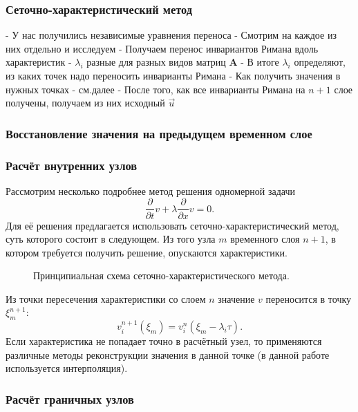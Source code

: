 \subsubsection{Сеточно-характеристический метод}


- У нас получились независимые уравнения переноса
- Смотрим на каждое из них отдельно и исследуем
- Получаем перенос инвариантов Римана вдоль характеристик
- $\lambda_i$ разные для разных видов матриц $\mathbf A$
- В итоге $\lambda_i$ определяют, из каких точек надо переносить инварианты Римана
- Как получить значения в нужных точках - см.далее
- После того, как все инварианты Римана на $n+1$ слое получены, получаем из них исходный $\vec u$


\subsubsection{Восстановление значения на предыдущем временном слое}


\subsubsection{Расчёт внутренних узлов}
Рассмотрим несколько подробнее метод решения одномерной задачи
\begin{equation}
\frac{\partial}{\partial t}v+\lambda \frac{\partial}{\partial x}v = 0.
\label{one_dim_eq}
\end{equation}
Для её решения предлагается использовать сеточно-характеристический метод, суть
которого состоит в следующем. Из того узла $m$ временного слоя $n+1$, в котором
требуется получить решение, опускаются характеристики.
\begin{figure}[h]
\caption{Принципиальная схема сеточно-характеристического метода.}
\end{figure}
Из точки пересечения характеристики со слоем $n$ значение $v$ переносится в 
точку $\xi^{n+1}_m$:
$$v_i^{n+1}(\xi_m)=v^{n}_i(\xi_m-\lambda_i\tau).$$
Если характеристика не попадает точно в расчётный узел, то применяются различные
методы реконструкции значения в данной точке (в данной работе используется
интерполяция).

\subsubsection{Расчёт граничных узлов}

